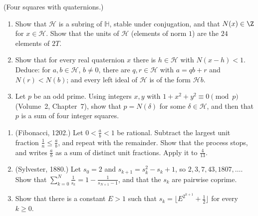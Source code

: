 \begin{exercise}[$\star\star\star$]\label{ex:hurwitz}
(Four squares with quaternions.)
\begin{enumerate}[label=(\alph*)]
\item Show that $\mathcal H$ is a subring of $\mathbb H$, stable under conjugation, and that $N(x)\in\Z$ for $x\in\mathcal H$. Show that the units of $\mathcal H$ (elements of norm $1$) are the $24$ elements of $2T$.
\item Show that for every real quaternion $x$ there is $h\in\mathcal H$ with $N(x-h)<1$. Deduce: for $a,b\in\mathcal H$, $b\ne0$, there are $q,r\in\mathcal H$ with $a=qb+r$ and $N(r)<N(b)$; and every left ideal of $\mathcal H$ is of the form $\mathcal Hb$.
\item Let $p$ be an odd prime. Using integers $x,y$ with $1+x^2+y^2\equiv0\pmod p$ (Volume~2, Chapter~7), show that $p=N(\delta)$ for some $\delta\in\mathcal H$, and then that $p$ is a sum of four integer squares.
\end{enumerate}
\end{exercise}

\begin{exercise}[$\star\star\star$]\label{pb:sylvester}
\begin{enumerate}[label=(\alph*)]
\item (Fibonacci, 1202.) Let $0<\frac ab<1$ be rational. Subtract the largest unit fraction $\frac1n\le\frac ab$, and repeat
with the remainder. Show that the process stops, and writes $\frac ab$ as a sum of distinct unit fractions. Apply it to
$\frac4{13}$.
\item (Sylvester, 1880.) Let $s_0=2$ and $s_{k+1}=s_k^2-s_k+1$, so $2,3,7,43,1807,\ldots$. Show that
$\sum_{k=0}^N\frac1{s_k}=1-\frac1{s_{N+1}-1}$, and that the $s_k$ are pairwise coprime.
\item Show that there is a constant $E>1$ such that $s_k=\bigl\lfloor E^{2^{k+1}}+\frac12\bigr\rfloor$ for every $k\ge0$.
\end{enumerate}
\end{exercise}

